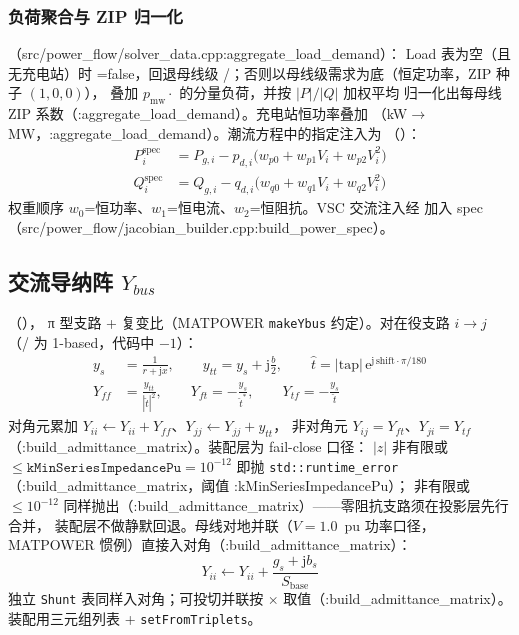 \subsubsection*{负荷聚合与 ZIP 归一化}
（src/power\_flow/solver\_data.cpp:aggregate\_load\_demand）：
Load 表为空（且无充电站）时 =false，回退母线级
/；否则以母线级需求为底（恒定功率，ZIP 种子 $(1,0,0)$），
叠加 $p_{\mathrm{mw}}\cdot$ 的分量负荷，并按 $|P|/|Q|$ 加权平均
归一化出每母线 ZIP 系数（:aggregate\_load\_demand）。充电站恒功率叠加
（kW$\to$MW，:aggregate\_load\_demand）。潮流方程中的指定注入为
（）：
\begin{align*}
P_i^{\mathrm{spec}} &= P_{g,i}-p_{d,i}\big(w_{p0}+w_{p1}V_i+w_{p2}V_i^2\big)\\
Q_i^{\mathrm{spec}} &= Q_{g,i}-q_{d,i}\big(w_{q0}+w_{q1}V_i+w_{q2}V_i^2\big)
\end{align*}
权重顺序 $w_0$=恒功率、$w_1$=恒电流、$w_2$=恒阻抗。VSC 交流注入经
 加入 spec（src/power\_flow/jacobian\_builder.cpp:build\_power\_spec）。

\subsection{交流导纳阵 $Y_{bus}$}
（），
π 型支路 + 复变比（MATPOWER \texttt{makeYbus} 约定）。对在役支路 $i\to j$
（/ 为 1-based，代码中 $-1$）：
\begin{align*}
y_s &= \frac{1}{r+\mathrm{j}x},\qquad
y_{tt} = y_s+\mathrm{j}\frac{b}{2},\qquad
\hat{t} = |\mathrm{tap}|\,\mathrm{e}^{\mathrm{j}\,\mathrm{shift}\cdot\pi/180}\\
Y_{ff} &= \frac{y_{tt}}{|\hat{t}|^2},\qquad
Y_{ft} = -\frac{y_s}{\hat{t}^{*}},\qquad
Y_{tf} = -\frac{y_s}{\hat{t}}
\end{align*}
对角元累加 $Y_{ii}\leftarrow Y_{ii}+Y_{ff}$、$Y_{jj}\leftarrow Y_{jj}+y_{tt}$，
非对角元 $Y_{ij}=Y_{ft}$、$Y_{ji}=Y_{tf}$（:build\_admittance\_matrix）。装配层为 fail-close 口径：
$|z|$ 非有限或 $\le\texttt{kMinSeriesImpedancePu}=10^{-12}$ 即抛
\texttt{std::runtime\_error}（:build\_admittance\_matrix，阈值 :kMinSeriesImpedancePu）； 非有限或
$\le 10^{-12}$ 同样抛出（:build\_admittance\_matrix）——零阻抗支路须在投影层先行合并，
装配层不做静默回退。母线对地并联（$V=1.0$~pu 功率口径，
MATPOWER 惯例）直接入对角（:build\_admittance\_matrix）：
\[
Y_{ii}\leftarrow Y_{ii}+\frac{g_s+\mathrm{j}b_s}{S_{\mathrm{base}}}
\]
独立 \texttt{Shunt} 表同样入对角；可投切并联按
$\times$ 取值（:build\_admittance\_matrix）。
装配用三元组列表 + \texttt{setFromTriplets}。


